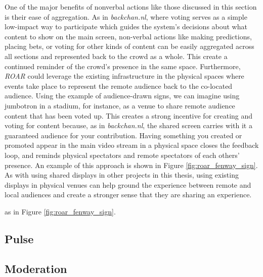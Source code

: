 One of the major benefits of nonverbal actions like those discussed in this section is their ease of aggregation. As in \emph{backchan.nl}, where voting serves as a simple low-impact way to participate which guides the system's decisions about what content to show on the main screen, non-verbal actions like making predictions, placing bets, or voting for other kinds of content can be easily aggregated across all sections and represented back to the crowd as a whole. This create a continued reminder of the crowd's presence in the same space. Furthermore, \emph{ROAR} could leverage the existing infrastructure in the physical spaces where events take place to represent the remote audience back to the co-located audience. Using the example of audience-drawn signs, we can imagine using jumbotron in a stadium, for instance, as a venue to share remote audience content that has been voted up. This creates a strong incentive for creating and voting for content because, as in \emph{backchan.nl}, the shared screen carries with it a guaranteed audience for your contribution. Having something you created or promoted appear in the main video stream in a physical space closes the feedback loop, and reminds physical spectators and remote spectators of each others' presence. An example of this approach is shown in Figure \ref{fig:roar_fenway_sign}. As with using shared displays in other projects in this thesis, using existing displays in physical venues can help ground the experience between remote and local audiences and create a stronger sense that they are sharing an experience.


as in Figure \ref{fig:roar_fenway_sign}. 
\subsection{Pulse}

\subsection{Moderation}




